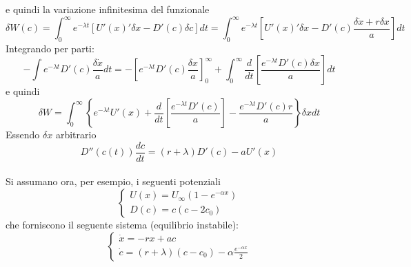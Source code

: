\documentclass[12pt, a4paper]{book}
\theoremstyle{theorem}
\begin{document}
				e quindi la variazione infinitesima del funzionale
				\begin{equation*}
					\delta W(c)=\int_{0}^{\infty}e^{-\lambda t}\left[U'(x)'\delta x-D'(c)\delta c\right]dt=\int_{0}^{\infty}e^{-\lambda t}\left[U'(x)'\delta x-D'(c)\frac{\delta\dot{x}+r\delta x}{a}\right]dt
				\end{equation*}
				Integrando per parti:
				\begin{equation*}
					-\int e^{-\lambda t}D'(c)\frac{\delta\dot{x}}{a}dt=-\left[ e^{-\lambda t}D'(c)\frac{\delta x}{a} \right]_{0}^{\infty} + \int_{0}^{\infty}\frac{d}{dt}\left[\frac{e^{-\lambda t}D'(c)\delta x}{a}\right]dt
				\end{equation*}
				e quindi
				\begin{equation*}
					\delta W=\int_{0}^{\infty}\left\{ e^{-\lambda t}U'(x)+\frac{d}{dt}\left[\frac{e^{-\lambda t}D'(c)}{a}\right]-\frac{e^{-\lambda t}D'(c)r}{a} \right\}\delta xdt
				\end{equation*}
				Essendo $\delta x$ arbitrario
				\begin{equation*}
					D''\left(c(t)\right)\frac{dc}{dt}=(r+\lambda)D'(c)-aU'(x)
				\end{equation*}
				\\Si assumano ora, per esempio, i seguenti potenziali
				\begin{equation}
					\begin{cases}
						U(x)=U_{\infty}\left(1-e^{-\alpha x}\right)\\
						D(c)=c\left(c-2c_{0}\right)
					\end{cases}
				\end{equation}
				che forniscono il seguente sistema (equilibrio instabile):
				\begin{equation}
					\begin{cases}
						\dot{x}=-rx+ac\\
						\dot{c}=(r+\lambda)(c-c_{0})-\alpha\frac{e^{-\alpha x}}{2}
					\end{cases}
				\end{equation}
\end{document}
